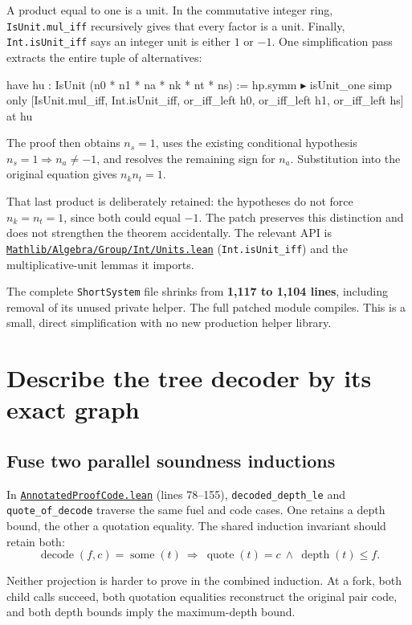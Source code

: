 \documentclass[11pt,letterpaper]{article}
\newcommand{\code}[1]{\nolinkurl{#1}}
\newcommand{\src}[2]{\href{https://github.com/VladimirReshetnikov/ProveIt/blob/e73fa2e916c9bb6f61c79e4fe2cd02b5f43e9d11/Computability/DiophantineConsistency/Lean/DiophantineConsistency/#1.lean}{\nolinkurl{#1.lean}} (lines #2)}
\newcommand{\mathsrc}[2]{\href{https://github.com/leanprover-community/mathlib4/blob/81a5d257c8e410db227a6665ed08f64fea08e997/Mathlib/#1.lean}{\nolinkurl{Mathlib/#1.lean}} (#2)}
\begin{document}
A product equal to one is a unit. In the commutative integer ring, \code{IsUnit.mul_iff} recursively gives that every factor is a unit. Finally, \code{Int.isUnit_iff} says an integer unit is either \(1\) or \(-1\). One simplification pass extracts the entire tuple of alternatives:

\begin{Lean}
have hu : IsUnit (n0 * n1 * na * nk * nt * ns) :=
  hp.symm ▸ isUnit_one
simp only [IsUnit.mul_iff, Int.isUnit_iff, or_iff_left h0,
  or_iff_left h1, or_iff_left hs] at hu
\end{Lean}

The proof then obtains \(n_s=1\), uses the existing conditional hypothesis \(n_s=1\Rightarrow n_a\ne-1\), and resolves the remaining sign for \(n_a\). Substitution into the original equation gives \(n_k n_t=1\).

That last product is deliberately retained: the hypotheses do not force \(n_k=n_t=1\), since both could equal \(-1\). The patch preserves this distinction and does not strengthen the theorem accidentally. The relevant API is \mathsrc{Algebra/Group/Int/Units}{\code{Int.isUnit_iff}} and the multiplicative-unit lemmas it imports.

The complete \code{ShortSystem} file shrinks from \textbf{1,117 to 1,104 lines}, including removal of its unused private helper. The full patched module compiles. This is a small, direct simplification with no new production helper library.

\section{Describe the tree decoder by its exact graph}

\subsection{Fuse two parallel soundness inductions}

In \src{AnnotatedProofCode}{78--155}, \code{decoded_depth_le} and \code{quote_of_decode} traverse the same fuel and code cases. One retains a depth bound, the other a quotation equality. The shared induction invariant should retain both:
\[
 \operatorname{decode}(f,c)=\operatorname{some}(t)
 \ \Longrightarrow\
 \operatorname{quote}(t)=c\ \land\ \operatorname{depth}(t)\le f.
\]

Neither projection is harder to prove in the combined induction. At a fork, both child calls succeed, both quotation equalities reconstruct the original pair code, and both depth bounds imply the maximum-depth bound.
\end{document}
